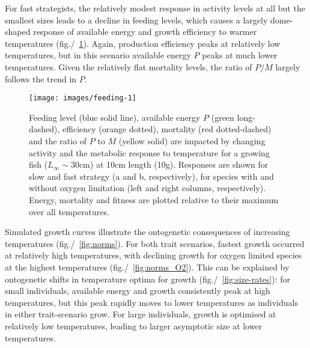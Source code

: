 \documentclass[11pt]{article}\usepackage[]{graphicx}\usepackage[]{color}
\makeatletter
\def\maxwidth{ %
  \ifdim\Gin@nat@width>\linewidth
    \linewidth
  \else
    \Gin@nat@width
  \fi
}
\makeatother
\begin{document}
For fast strategists, the relatively modest response in activity levels at all but the smallest sizes leads to a decline in feeding levels, which causes a largely dome-shaped response of available energy and growth efficiency to warmer temperatures (fig./~\ref{fig:feeding}). Again, production efficiency peaks at relatively low temperatures, but in this scenario available energy $P$ peaks at much lower temperatures. Given the relatively flat mortality levels, the ratio of $P/M$ largely follows the trend in $P$. 

\begin{figure}

{\centering \texttt{[image: images/feeding-1]} 

}

\caption[Feeding level (blue solid line), available energy $P$ (green long-dashed), efficiency (orange dotted), mortality (red dotted-dashed) and the ratio of $P$ to $M$ (yellow solid) are impacted by changing activity and the metabolic response to temperature for a growing fish ($L_{\infty}\sim 30$cm) at 10cm length (10g)]{Feeding level (blue solid line), available energy $P$ (green long-dashed), efficiency (orange dotted), mortality (red dotted-dashed) and the ratio of $P$ to $M$ (yellow solid) are impacted by changing activity and the metabolic response to temperature for a growing fish ($L_{\infty}\sim 30$cm) at 10cm length (10g). Responses are shown for slow  and fast strategy (a and b, respectively), for species with and without oxygen limitation (left and right columns, respectively). Energy, mortality and fitness are plotted relative to their maximum over all temperatures.}\label{fig:feeding}
\end{figure}



Simulated growth curves illustrate the ontogenetic consequences of increasing temperatures (fig./~\ref{fig:norms}). For both trait scenarios, fastest growth occurred at relatively high temperatures, with declining growth for oxygen limited species at the highest temperatures (fig./~\ref{fig:norms_O2}). This can be explained by ontogenetic shifts in temperature optima for growth (fig./~\ref{fig:size-rates}): for small individuals, available energy and growth consistently peak at high temperatures, but this peak rapidly moves to lower temperatures as individuals in either trait-scenario grow. For large individuals, growth is optimised at relatively low temperatures, leading to larger asymptotic size at lower temperatures. 
\end{document}
